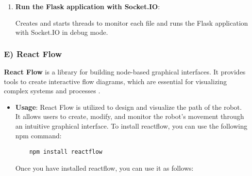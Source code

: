 \begin{itemize}
\begin{enumerate}
    \item \textbf{Run the Flask application with Socket.IO}:
    \vspace{2mm}
    
    \vspace{-2mm}
        Creates and starts threads to monitor each file and runs the Flask application with Socket.IO in debug mode.



\end{enumerate}


\end{itemize}


\subsubsection*{E) React Flow}
\vspace{-2mm}
\textbf{React Flow} is a library for building node-based graphical interfaces. It provides tools to create interactive flow diagrams, which are essential for visualizing complex systems and processes \cite{reactflow} \cite{reactflow-examples}.

\begin{itemize}
    \item \textbf{Usage}: React Flow is utilized to design and visualize the path of the robot. It allows users to create, modify, and monitor the robot's movement through an intuitive graphical interface. To install reactflow, you can use the following
npm command:

\vspace{-2mm}
            \begin{verbatim}
    npm install reactflow
    \end{verbatim}
    \newpage
    Once you have installed reactflow, you can use it as follows:
\vspace{2mm}
    
\end{itemize}

